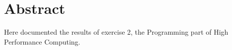 
\section*{Abstract}
Here documented the results of exercise 2, the Programming part of High Performance Computing.
